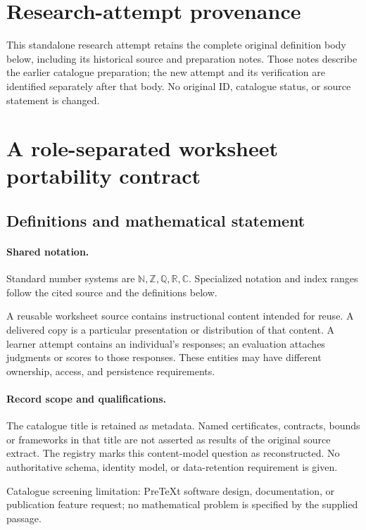 \documentclass[11pt]{article}
\begin{document}
\section*{Research-attempt provenance}
This standalone research attempt retains the complete original definition body below,
including its historical source and preparation notes. Those notes describe the
earlier catalogue preparation; the new attempt and its verification are identified
separately after that body. No original ID, catalogue status, or source statement is changed.

\section{A role-separated worksheet portability contract}\label{statement}

\subsection{Definitions and mathematical statement}

\paragraph{Shared notation.}Standard number systems are $\mathbb N,\mathbb Z,\mathbb Q,\mathbb R,\mathbb C$. Specialized notation and index ranges follow the cited source and the definitions below.


A reusable worksheet source contains instructional content intended for reuse. A delivered copy is a particular presentation or distribution of that content. A learner attempt contains an individual's responses; an evaluation attaches judgments or scores to those responses. These entities may have different ownership, access, and persistence requirements.
\paragraph{Record scope and qualifications.}
The catalogue title is retained as metadata. Named certificates, contracts, bounds or frameworks in that title are not asserted as results of the original source extract.
The registry marks this content-model question as reconstructed. No authoritative schema, identity model, or data-retention requirement is given.

Catalogue screening limitation: PreTeXt software design, documentation, or publication feature request; no mathematical problem is specified by the supplied passage.
\end{document}

